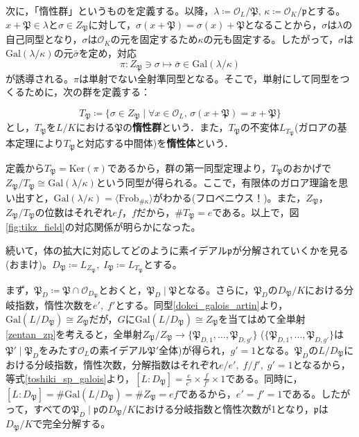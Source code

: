 次に，「惰性群」というものを定義する。以降，$\lambda\coloneq\mathcal{O}_L/{\mathfrak{P}},\,\kappa\coloneq\mathcal{O}_K/{\mathfrak{p}}$とする。$x+\mathfrak{P}\in\lambda$と$\sigma\in Z_{\mathfrak{P}}$に対して，$\sigma(x+\mathfrak{P})=\sigma(x)+\mathfrak{P}$となることから，$\sigma$は$\lambda$の自己同型となり，$\sigma$は$\mathcal{O}_K$の元を固定するため$\kappa$の元も固定する。したがって，$\sigma$は$\mathrm{Gal}(\lambda/{\kappa})$の元$\bar{\sigma}$を定め，対応\[
\pi\colon Z_{\mathfrak{P}}\ni\sigma\mapsto\bar{\sigma}\in\mathrm{Gal}(\lambda/\kappa)
\]が誘導される。$\pi$は単射でない全射準同型となる。そこで，単射にして同型をつくるために，次の群を定義する：
\begin{dfn}
    \[
    T_{\mathfrak{P}}\coloneqq\{\sigma\in Z_{\mathfrak{P}}\mid\forall x\in\mathcal{O}_L,\,\sigma(x+\mathfrak{P})=x+\mathfrak{P}\}
    \]とし，$T_{\mathfrak{P}}$を$L/K$における$\mathfrak{P}$の\textbf{惰性群}という．また，$T_{\mathfrak{P}}$の不変体$L_{T_{\mathfrak{P}}}$(ガロアの基本定理により$T_{\mathfrak{P}}$と対応する中間体)を\textbf{惰性体}という．
\end{dfn}
定義から$T_{\mathfrak{P}}=\mathrm{Ker}(\pi)$であるから，群の第一同型定理より，$T_{\mathfrak{P}}$のおかげで$Z_{\mathfrak{P}}/{T_{\mathfrak{P}}}\cong\mathrm{Gal}(\lambda/\kappa)$という同型が得られる。ここで，有限体のガロア理論を思い出すと，$\mathrm{Gal}(\lambda/\kappa)=\langle\mathrm{Frob}_{\#\kappa}\rangle$がわかる(フロベニウス！)。また，$Z_{\mathfrak{P}}$，$Z_{\mathfrak{P}}/{T_{\mathfrak{P}}}$の位数はそれぞれ$ef$，$f$だから，$\# T_{\mathfrak{P}}=e$である。以上で，図\ref{fig:tikz_field}の対応関係が明らかになった。

続いて，体の拡大に対応してどのように素イデアル$\mathfrak{p}$が分解されていくかを見る(おまけ)。$D_{\mathfrak{P}}\coloneqq L_{Z_{\mathfrak{P}}},\; I_{\mathfrak{P}}\coloneqq L_{T_{\mathfrak{P}}}$とする。

まず，$\mathfrak{P}_D\coloneqq\mathfrak{P}\cap\mathcal{O}_{D_{\mathfrak{P}}}$とおくと，$\mathfrak{P}_D\mid\mathfrak{P}$となる。さらに，$\mathfrak{P}_D$の$D_{\mathfrak{P}}/K$における分岐指数，惰性次数を$e',\; f'$とする。同型\eqref{dokei_galois_artin}より，$\mathrm{Gal}(L/D_{\mathfrak{P}})\cong Z_{\mathfrak{P}}$だが，$G$に$\mathrm{Gal}(L/D_{\mathfrak{P}})\cong Z_{\mathfrak{P}}$を当てはめて全単射\eqref{zentan_zp}を考えると，全単射$Z_{\mathfrak{P}}/Z_\mathfrak{P}\rightarrow\{\mathfrak{P}_{D,1},\ldots,\mathfrak{P}_{D,g'}\}$\; ($\{\mathfrak{P}_{D,1},\ldots,\mathfrak{P}_{D,g'}\}$は$\mathfrak{P'}\mid\mathfrak{P}_D$をみたす$\mathcal{O}_L$の素イデアル$\mathfrak{P'}$全体)が得られ，$g'=1$となる。$\mathfrak{P}_D$の$L/{D_{\mathfrak{P}}}$における分岐指数，惰性次数，分解指数はそれぞれ$e/e',\; f/f',\; g'=1$となるから，等式\eqref{toshiki_sp_galois}より，$[L:D_{\mathfrak{P}}]=\frac{e}{e'}\times\frac{f}{f'}\times 1$である。同時に，$[L:D_{\mathfrak{P}}]=\#\mathrm{Gal}(L/D_{\mathfrak{P}})=\# Z_{\mathfrak{P}}=ef$であるから，$e'=f'=1$である。したがって，すべての$\mathfrak{P}_D\mid\mathfrak{p}$の$D_{\mathfrak{P}}/K$における分岐指数と惰性次数が1となり，$\mathfrak{p}$は$D_{\mathfrak{P}}/K$で完全分解する。

